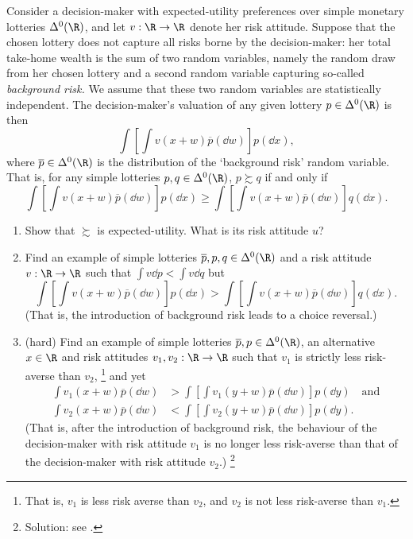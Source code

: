 \begin{exercise}
	\label{exercise:background_risk}
	Consider a decision-maker with expected-utility preferences over simple monetary lotteries $\Delta^0(\R)$, and let $v : \R \to \R$ denote her risk attitude. Suppose that the chosen lottery does not capture all risks borne by the decision-maker: her total take-home wealth is the sum of two random variables, namely the random draw from her chosen lottery and a second random variable capturing so-called \emph{background risk.} We assume that these two random variables are statistically independent. The decision-maker's valuation of any given lottery $p \in \Delta^0(\R)$ is then
	\begin{equation*}
		\int \left[ \int v(x+w) \overline{p}(\dd w) \right] p(\dd x) ,
	\end{equation*}
	where $\overline{p} \in \Delta^0(\R)$ is the distribution of the `background risk' random variable. That is, for any simple lotteries $p,q \in \Delta^0(\R)$, $p \succsim q$ if and only if 
	\begin{equation*}
		\int \left[ \int v(x+w) \overline{p}(\dd w) \right] p(\dd x)
		\geq \int \left[ \int v(x+w) \overline{p}(\dd w) \right] q(\dd x) .
	\end{equation*}

	\begin{enumerate}[label=(\alph*)]
	
		\item Show that $\succsim$ is expected-utility. What is its risk attitude $u$?

		\item Find an example of simple lotteries $\overline{p},p,q \in \Delta^0(\R)$ and a risk attitude $v : \R \to \R$ such that $\int v \dd p < \int v \dd q$ but
		\begin{equation*}
			\int \left[ \int v(x+w) \overline{p}(\dd w) \right] p(\dd x)
			> \int \left[ \int v(x+w) \overline{p}(\dd w) \right] q(\dd x) .
		\end{equation*}
		(That is, the introduction of background risk leads to a choice reversal.)

		\item (hard) Find an example of simple lotteries $\overline{p},p \in \Delta^0(\R)$, an alternative $x \in \R$ and risk attitudes $v_1,v_2 : \R \to \R$ such that $v_1$ is strictly less risk-averse than $v_2$,%
			\footnote{That is, $v_1$ is less risk averse than $v_2$, and $v_2$ is not less risk-averse than $v_1$.}
		and yet
		\begin{align*}
			\int v_1(x+w) \overline{p}(\dd w)
			&> \int \left[ \int v_1(y+w) \overline{p}(\dd w) \right] p(\dd y) 
			\quad \text{and}
			\\
			\int v_2(x+w) \overline{p}(\dd w)
			&< \int \left[ \int v_2(y+w) \overline{p}(\dd w) \right] p(\dd y) .
		\end{align*}
		(That is, after the introduction of background risk, the behaviour of the decision-maker with risk attitude $v_1$ is no longer less risk-averse than that of the decision-maker with risk attitude $v_2$.)%
			\footnote{Solution: see \textcite{KihlstromRomerWilliams1981}.}
	

\end{enumerate}
\end{exercise}
